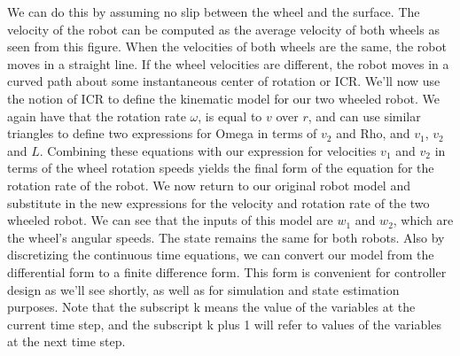 We can do this by assuming no slip between the wheel and the surface. The velocity of the robot can be computed as the average velocity of both wheels as seen from this figure. When the velocities of both wheels are the same, the robot moves in a straight line. If the wheel velocities are different, the robot moves in a curved path about some instantaneous center of rotation or ICR. We'll now use the notion of ICR to define the kinematic model for our two wheeled robot. We again have that the rotation rate $\omega$, is equal to $v$ over $r$, and can use similar triangles to define two expressions for Omega in terms of $v_2$ and Rho, and $v_1$, $v_2$ and $L$. Combining these equations with our expression for velocities $v_1$ and $v_2$ in terms of the wheel rotation speeds yields the final form of the equation for the rotation rate of the robot. We now return to our original robot model and substitute in the new expressions for the velocity and rotation rate of the two wheeled robot. We can see that the inputs of this model are $w_1$ and $w_2$, which are the wheel's angular speeds. The state remains the same for both robots. Also by discretizing the continuous time equations, we can convert our model from the differential form to a finite difference form. This form is convenient for controller design as we'll see shortly, as well as for simulation and state estimation purposes. Note that the subscript k means the value of the variables at the current time step, and the subscript k plus 1 will refer to values of the variables at the next time step. 


